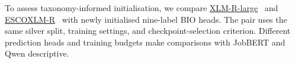 \label{sec:external-benchmark-plan}

To assess taxonomy-informed initialisation, we compare \href{https://huggingface.co/FacebookAI/xlm-roberta-large}{XLM-R-large}~\citep{conneau2020xlmr} and \href{https://huggingface.co/jjzha/esco-xlm-roberta-large}{ESCOXLM-R}~\citep{zhang2023escoxlmr} with newly initialised nine-label BIO heads. The pair uses the same silver split, training settings, and checkpoint-selection criterion. Different prediction heads and training budgets make comparisons with JobBERT and Qwen descriptive.
